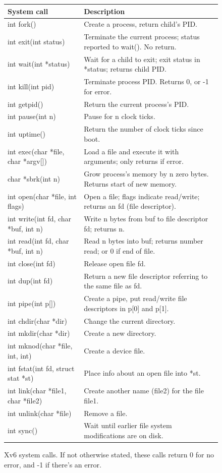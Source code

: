 \begin{figure}[t]
\center
\begin{tabular}{ll}
{\bf System call} & {\bf Description} \\
\midrule
int fork() & Create a process, return child's PID. \\
int exit(int status) & Terminate the current process; status reported to wait(). No return. \\
int wait(int *status) & Wait for a child to exit; exit status in *status; returns child PID. \\
int kill(int pid) & Terminate process PID. Returns 0, or -1 for error. \\
int getpid() & Return the current process's PID. \\
int pause(int n) & Pause for n clock ticks. \\
int uptime() & Return the number of clock ticks since boot. \\
int exec(char *file, char *argv[]) & Load a file and execute it with arguments; only returns if error. \\
char *sbrk(int n) & Grow process's memory by n zero bytes. Returns start of new memory. \\
int open(char *file, int flags) & Open a file; flags indicate read/write; returns an fd (file descriptor). \\
int write(int fd, char *buf, int n) & Write n bytes from buf to file descriptor fd; returns n. \\
int read(int fd, char *buf, int n) & Read n bytes into buf; returns number read; or 0 if end of file. \\
int close(int fd) & Release open file fd. \\
int dup(int fd) & Return a new file descriptor referring to the same file as fd.\\
int pipe(int p[]) & Create a pipe, put read/write file descriptors in p[0] and p[1]. \\
int chdir(char *dir) & Change the current directory. \\
int mkdir(char *dir) & Create a new directory. \\
int mknod(char *file, int, int) & Create a device file. \\
int fstat(int fd, struct stat *st) & Place info about an open file into *st. \\
int link(char *file1, char *file2) & Create another name (file2) for the file file1. \\
int unlink(char *file) & Remove a file. \\
int sync() & Wait until earlier file system modifications are on disk. \\
\end{tabular}
\caption{Xv6 system calls. If not otherwise stated, these calls return
0 for no error, and -1 if there's an error.}
\label{fig:api}
\end{figure}

